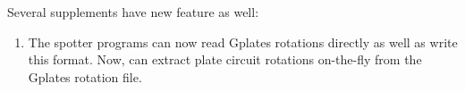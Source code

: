 \begin{enumerate}
\end{enumerate}

Several supplements have new feature as well:

\begin{enumerate}
	\item The spotter programs can now read Gplates rotations directly as well as write this format.
		Now,  can extract plate circuit rotations on-the-fly from the Gplates rotation file.
\end{enumerate}
